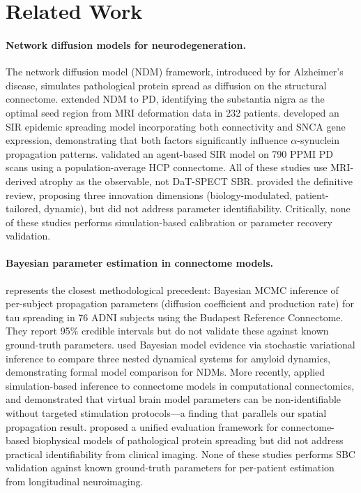 \section{Related Work}

\paragraph{Network diffusion models for neurodegeneration.}
The network diffusion model (NDM) framework, introduced by \cite{raj2012} for Alzheimer's disease, simulates pathological protein spread as diffusion on the structural connectome. \cite{pandya2019} extended NDM to PD, identifying the substantia nigra as the optimal seed region from MRI deformation data in 232 patients. \cite{zheng2019} developed an SIR epidemic spreading model incorporating both connectivity and SNCA gene expression, demonstrating that both factors significantly influence $\alpha$-synuclein propagation patterns. \cite{abdelgawad2022} validated an agent-based SIR model on 790 PPMI PD scans using a population-average HCP connectome. All of these studies use MRI-derived atrophy as the observable, not DaT-SPECT SBR. \cite{vogel2023} provided the definitive review, proposing three innovation dimensions (biology-modulated, patient-tailored, dynamic), but did not address parameter identifiability. Critically, none of these studies performs simulation-based calibration or parameter recovery validation.

\paragraph{Bayesian parameter estimation in connectome models.}
\cite{schafer2021} represents the closest methodological precedent: Bayesian MCMC inference of per-subject propagation parameters (diffusion coefficient and production rate) for tau spreading in 76 ADNI subjects using the Budapest Reference Connectome. They report 95\% credible intervals but do not validate these against known ground-truth parameters. \cite{garbarino2021} used Bayesian model evidence via stochastic variational inference to compare three nested dynamical systems for amyloid dynamics, demonstrating formal model comparison for NDMs. More recently, \cite{boelts2023} applied simulation-based inference to connectome models in computational connectomics, and \cite{hashemi2024} demonstrated that virtual brain model parameters can be non-identifiable without targeted stimulation protocols---a finding that parallels our spatial propagation result. \cite{ren2025} proposed a unified evaluation framework for connectome-based biophysical models of pathological protein spreading but did not address practical identifiability from clinical imaging. None of these studies performs SBC validation against known ground-truth parameters for per-patient estimation from longitudinal neuroimaging.

